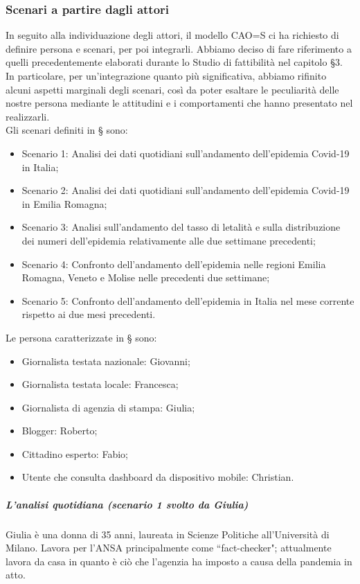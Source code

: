 \noindent
\subsubsection{Scenari a partire dagli attori}
In seguito alla individuazione degli attori, il modello CAO=S ci ha richiesto di definire persona e scenari, per poi integrarli.
Abbiamo deciso di fare riferimento a quelli precedentemente elaborati durante lo Studio di fattibilità nel capitolo §3.
In particolare, per un'integrazione quanto più significativa, abbiamo rifinito alcuni aspetti marginali degli scenari, così da poter esaltare le peculiarità delle nostre persona mediante le attitudini e i comportamenti che hanno presentato nel realizzarli.\\
Gli scenari definiti in § sono:
\begin{itemize}
    \item Scenario 1: Analisi dei dati quotidiani sull'andamento dell'epidemia Covid-19 in Italia;
    \item Scenario 2: Analisi dei dati quotidiani sull'andamento dell'epidemia Covid-19 in Emilia Romagna;
    \item Scenario 3: Analisi sull'andamento del tasso di letalità e sulla distribuzione dei numeri dell'epidemia relativamente alle due settimane precedenti;
    \item Scenario 4: Confronto dell'andamento dell'epidemia nelle regioni Emilia Romagna, Veneto e Molise nelle precedenti due settimane;
    \item Scenario 5: Confronto dell'andamento dell'epidemia in Italia nel mese corrente rispetto ai due mesi precedenti.
\end{itemize}
Le persona caratterizzate in § sono:
\begin{itemize}
    \item Giornalista testata nazionale: Giovanni;
    \item Giornalista testata locale: Francesca;
    \item Giornalista di agenzia di stampa: Giulia;
    \item Blogger: Roberto;
    \item Cittadino esperto: Fabio;
    \item Utente che consulta dashboard da dispositivo mobile: Christian.
\end{itemize}
\noindent
\subparagraph{L'analisi quotidiana (scenario 1 svolto da Giulia)}
Giulia è una donna di 35 anni, laureata in Scienze Politiche all'Università di Milano.
Lavora per l'ANSA principalmente come ``fact-checker"; attualmente lavora da casa in quanto è ciò che l'agenzia ha imposto a causa della pandemia in atto.\\
